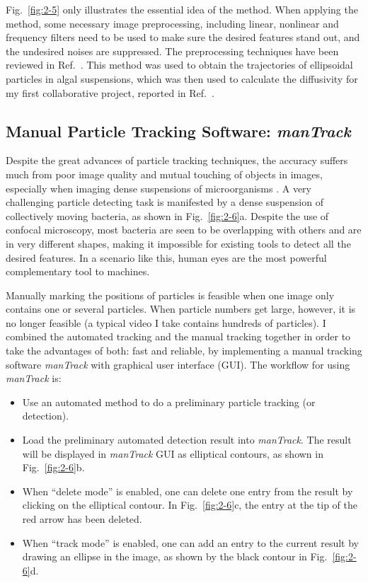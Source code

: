 Fig.~\ref{fig:2-5} only illustrates the essential idea of the method. When applying the method, some necessary image preprocessing, including linear, nonlinear and frequency filters need to be used to make sure the desired features stand out, and the undesired noises are suppressed. The preprocessing techniques have been reviewed in Ref.~\cite{Dorn2008, Rohr2010}. This method was used to obtain the trajectories of ellipsoidal particles in algal suspensions, which was then used to calculate the diffusivity for my first collaborative project, reported in Ref.~\cite{Yang2016}.

\subsection{Manual Particle Tracking Software: \textit{manTrack}}
Despite the great advances of particle tracking techniques, the accuracy suffers much from poor image quality and mutual touching of objects in images, especially when imaging dense suspensions of microorganisms \cite{Meijering2009}. A very challenging particle detecting task is manifested by a dense suspension of collectively moving bacteria, as shown in Fig.~\ref{fig:2-6}a. Despite the use of confocal microscopy, most bacteria are seen to be overlapping with others and are in very different shapes, making it impossible for existing tools to detect all the desired features. In a scenario like this, human eyes are the most powerful complementary tool to machines.

Manually marking the positions of particles is feasible when one image only contains one or several particles. When particle numbers get large, however, it is no longer feasible (a typical video I take contains hundreds of particles). I combined the automated tracking and the manual tracking together in order to take the advantages of both: fast and reliable, by implementing a manual tracking software \textit{manTrack} with graphical user interface (GUI). The workflow for using \textit{manTrack} is:

\begin{itemize}
	\item Use an automated method to do a preliminary particle tracking (or detection).
	\item Load the preliminary automated detection result into \textit{manTrack}. The result will be displayed in \textit{manTrack} GUI as elliptical contours, as shown in Fig.~\ref{fig:2-6}b.
	\item When ``delete mode'' is enabled, one can delete one entry from the result by clicking on the elliptical contour. In Fig.~\ref{fig:2-6}c, the entry at the tip of the red arrow has been deleted.
	\item When ``track mode'' is enabled, one can add an entry to the current result by drawing an ellipse in the image, as shown by the black contour in Fig.~\ref{fig:2-6}d.
\end{itemize}

